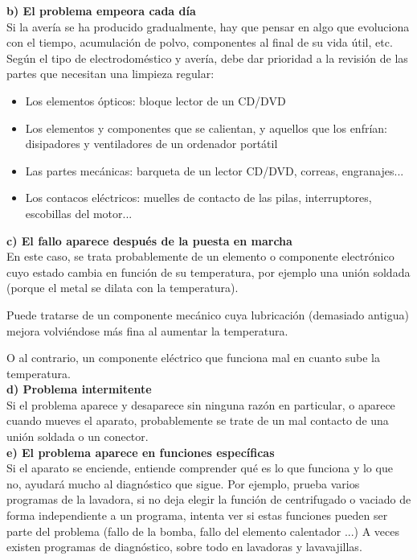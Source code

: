 \documentclass[a5paper,twoside,openany]{book}
\begin{document}
{\large \textbf{b) El problema empeora cada día}}\\

Si la avería se ha producido gradualmente, hay que pensar en algo que evoluciona con el tiempo, acumulación de polvo, componentes al final de su vida útil, etc.
Según el tipo de electrodoméstico y avería, debe dar prioridad a la revisión de las partes que necesitan una limpieza regular:

\begin{itemize}

\item Los elementos ópticos: bloque lector de un CD/DVD
\item Los elementos y componentes que se calientan, y aquellos que los enfrían: disipadores y ventiladores de un ordenador portátil
\item Las partes mecánicas: barqueta de un lector CD/DVD, correas, engranajes...
\item Los contacos eléctricos: muelles de contacto de las pilas, interruptores, escobillas del motor...
\end{itemize}

{\large \textbf{c) El fallo aparece después de la puesta en marcha}}\\

En este caso, se trata probablemente de un elemento o componente electrónico cuyo estado cambia en función de su temperatura, por ejemplo
una unión soldada (porque el metal se dilata con la temperatura).

Puede tratarse de un componente mecánico cuya lubricación (demasiado antigua) mejora volviéndose más fina al aumentar la temperatura.

O al contrario, un componente eléctrico que funciona mal en cuanto sube la
temperatura.\\
\newpage
{\large \textbf{d) Problema intermitente}}\\

Si el problema aparece y desaparece sin ninguna razón en particular, o aparece cuando mueves el aparato, probablemente se trate de un mal contacto de una unión soldada o un conector.\\

{\large \textbf{e) El problema aparece en funciones específicas}}\\

Si el aparato se enciende, entiende comprender qué es lo que funciona y lo que no, ayudará mucho al diagnóstico que sigue.
Por ejemplo, prueba varios programas de la lavadora, si no deja elegir la función de centrifugado o vaciado de forma independiente a un programa, intenta ver si estas funciones pueden ser parte del problema (fallo de la bomba, fallo del elemento calentador ...)
A veces existen programas de diagnóstico, sobre todo en lavadoras y lavavajillas.
\newpage
\end{document}
